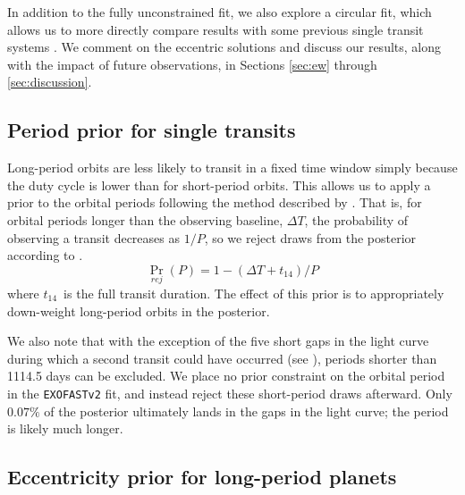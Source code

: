 \documentclass[twocolumn]{aastex63}
\begin{document}
In addition to the fully unconstrained fit, we also explore a circular fit, which allows us to more directly compare results with some previous single transit systems \citep[e.g.,][]{giles:2018}. We comment on the eccentric solutions and discuss our results, along with the impact of future observations, in Sections \ref{sec:ew} through \ref{sec:discussion}.

\subsection{Period prior for single transits}
\label{sec:single}

Long-period orbits are less likely to transit in a fixed time window simply because the duty cycle is lower than for short-period orbits. This allows us to apply a prior to the orbital periods following the method described by \citet{vanderburg:2018}. That is, for orbital periods longer than the observing baseline, $\Delta T$, the probability of observing a transit decreases as $1/P$, so we reject draws from the posterior according to .
\begin{equation}\label{eq:single}
    {\Pr}_{rej}(P) = 1 - (\Delta T + t_{14})/P
\end{equation}
where $t_{14}$\ is the full transit duration. The effect of this prior is to appropriately down-weight long-period orbits in the posterior.

We also note that with the exception of the five short gaps in the light curve during which a second transit could have occurred (see ), periods shorter than 1114.5 days can be excluded. We place no prior constraint on the orbital period in the \texttt{EXOFASTv2} fit, and instead reject these short-period draws afterward. Only $0.07\%$ of the posterior ultimately lands in the gaps in the light curve; the period is likely much longer.

\subsection{Eccentricity prior for long-period planets}
\label{sec:beta}
\end{document}
